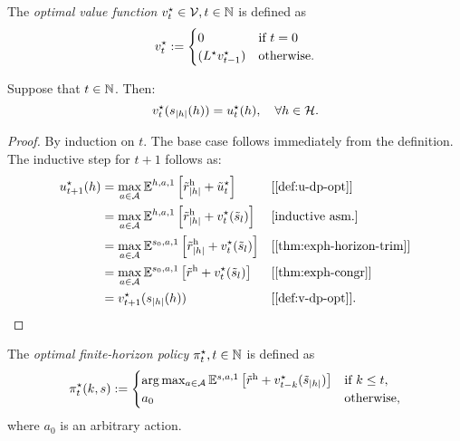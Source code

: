 \begin{definition} \label{def:v-dp-opt}
The \emph{optimal value function} $v^{\star}_t\in \mathcal{V}, t\in \mathbb{N}$ is defined as
\[
v^{\star}_t := 
\begin{cases}
    0 &\text{if } t = 0 \\
    (L^{\star}  v^{\star} _{t-1}) &\text{otherwise}.
\end{cases}
\]
\end{definition}

\begin{theorem}
Suppose that $t\in \mathbb{N} $. Then:
\[
v^{\star}_t(s_{|h|}(h)) = u^{\star}_t(h), \quad \forall h\in \mathcal{H}.
\]
\end{theorem}
\begin{proof}
By induction on $t$. The base case follows immediately from the definition. The inductive step for $t+1$ follows as:
\begin{align*}
  u\opt_{t+1}(h)
  &= \max_{a\in \mathcal{A}} \E^{h, a, 1} \left[ \rew_{|h|} + \tilde{u}\opt_t  \right]
  && \why{\cref{def:u-dp-opt}} \\
  &= \max_{a\in \mathcal{A}} \E^{h, a, 1} \left[ \rew_{|h|} + v\opt_t(\tilde{s}_l) \right] 
    && \why{inductive asm.}  \\
  &= \max_{a\in \mathcal{A}} \E^{s_0, a, 1} \left[ \rew_{|h|} + v\opt_t(\tilde{s}_l) \right]
    && \why{\cref{thm:exph-horizon-trim}} \\
  &= \max_{a\in \mathcal{A}} \E^{s_0, a, 1} \left[ \rew + v\opt_t(\tilde{s}_l) \right]
  && \why{\cref{thm:exph-congr}} \\
  &= v\opt_{t+1}(s_{|h|}(h)) && \why{\cref{def:v-dp-opt}}.
\end{align*}
\end{proof}


\begin{definition} \label{def:pi-opt}
  The \emph{optimal finite-horizon policy} $\pi^{\star}_t, t\in \mathbb{N}$ is defined as
  \[
    \pi^{\star}_t(k,s) :=
    \begin{cases}
      \arg\max_{a\in \mathcal{A}}  \mathbb{E}^{s, a, 1} \left[ \tilde{r}^{\mathrm{h}} + v_{t-k}^{\star} (\tilde{s}_{|h|}) \right]
      &\text{if } k \le t, \\
      a_0 &\text{otherwise},
    \end{cases}
  \]
  where $a_0$ is an arbitrary action.
\end{definition}

